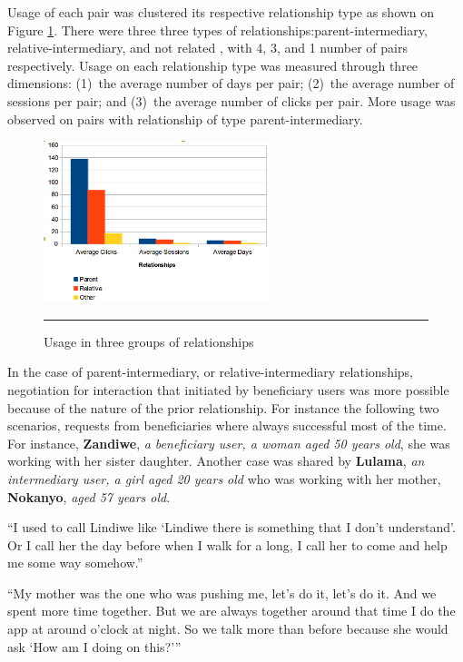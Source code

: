 Usage of each pair  was clustered its respective relationship type as shown on Figure \ref{figure:relation}. There were three three types of relationships:parent-intermediary, relative-intermediary, and not related , with 4, 3, and 1 number of pairs respectively. Usage on each relationship type was measured through three dimensions: (1)~the average number of days per pair; (2)~the average number of sessions per pair; and (3)~the average number of clicks per pair. More usage was observed on pairs with relationship of type parent-intermediary. 
\begin{figure}[htbp]
  \centering
    \includegraphics[width=0.6\textwidth]{Figures/relationships.png}
    \rule{35em}{0.5pt}
  \caption{Usage in three groups of relationships\citep{katule2016leveraging}}
  \label{figure:relation}
\end{figure}
In the case of parent-intermediary, or relative-intermediary relationships, negotiation for interaction that initiated by beneficiary users was more possible because of the nature of the prior relationship. For instance the following two scenarios, requests from beneficiaries where always successful most of the time. For instance, \textbf{Zandiwe}, \emph{a beneficiary user, a woman aged 50 years old}, she was working with her sister daughter. Another case was shared by  \textbf{Lulama}, \emph{an intermediary user, a girl aged 20 years old} who was working with her mother, \textbf{Nokanyo}, \emph{aged 57 years old}. 

 {``I used to call Lindiwe like `Lindiwe there is something that I don't understand'. Or I call her the day before when I walk for a long, I call her to come and help me some way somehow.''}

 {``My mother was the one who was pushing me, let’s do it, let’s do it. And we spent more time together. But we are always together around that time I do the app at around o'clock at night. So we talk more than before because she would ask `How am I doing on this?'''}

